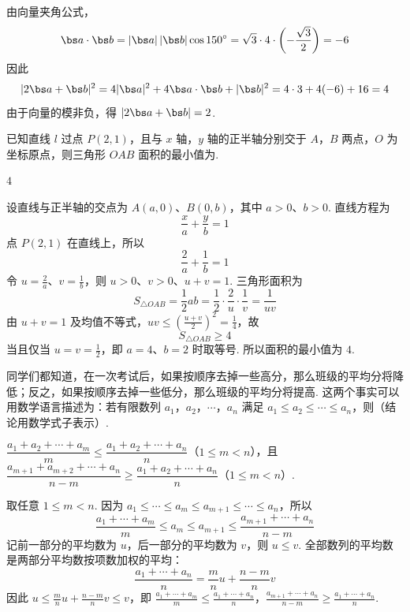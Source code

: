 \begin{solution}
由向量夹角公式，
\[
\bs a\cdot\bs b=|\bs a|\,|\bs b|\cos150^\circ
 =\sqrt3\cdot4\cdot\left(-\frac{\sqrt3}{2}\right)=-6
\]
因此
\[
|2\bs a+\bs b|^2=4|\bs a|^2+4\bs a\cdot\bs b+|\bs b|^2=4\cdot3+4(-6)+16=4
\]
由于向量的模非负，得 \(|2\bs a+\bs b|=2\).
\end{solution}

\begin{problem}
已知直线 \(l\) 过点 \(P(2,1)\)，且与 \(x\) 轴，\(y\) 轴的正半轴分别交于 \(A\)，\(B\) 两点，\(O\) 为坐标原点，则三角形 \(OAB\) 面积的最小值为\fillinblank{}.
\end{problem}

\begin{answer}
\(4\)
\end{answer}

\begin{solution}
设直线与正半轴的交点为 \(A(a,0)\)、\(B(0,b)\)，其中 \(a>0\)、\(b>0\). 直线方程为
\[
\frac{x}{a}+\frac{y}{b}=1
\]
点 \(P(2,1)\) 在直线上，所以
\[
\frac2a+\frac1b=1
\]
令 \(u=\frac2a\)、\(v=\frac1b\)，则 \(u>0\)、\(v>0\)、\(u+v=1\). 三角形面积为
\[
S_{\triangle OAB}=\frac12ab=\frac12\cdot\frac2u\cdot\frac1v=\frac1{uv}
\]
由 \(u+v=1\) 及均值不等式，\(uv\le\left(\frac{u+v}{2}\right)^2=\frac14\)，故
\[
S_{\triangle OAB}\ge4
\]
当且仅当 \(u=v=\frac12\)，即 \(a=4\)、\(b=2\) 时取等号. 所以面积的最小值为 \(4\).
\end{solution}

\begin{problem}
同学们都知道，在一次考试后，如果按顺序去掉一些高分，那么班级的平均分将降低；反之，如果按顺序去掉一些低分，那么班级的平均分将提高. 这两个事实可以用数学语言描述为：若有限数列 \(a_1\)，\(a_2\)，\(\cdots\)，\(a_n\) 满足 \(a_1\le a_2\le\cdots\le a_n\)，则（结论用数学式子表示）\fillinblank{}.
\end{problem}

\begin{answer}
\(\dfrac{a_1+a_2+\cdots+a_m}{m}\le\dfrac{a_1+a_2+\cdots+a_n}{n}\)（\(1\le m<n\)），且 \(\dfrac{a_{m+1}+a_{m+2}+\cdots+a_n}{n-m}\ge\dfrac{a_1+a_2+\cdots+a_n}{n}\)（\(1\le m<n\)）.
\end{answer}

\begin{solution}
取任意 \(1\le m<n\). 因为 \(a_1\le\cdots\le a_m\le a_{m+1}\le\cdots\le a_n\)，所以
\[
\frac{a_1+\cdots+a_m}{m}\le a_m\le a_{m+1}\le\frac{a_{m+1}+\cdots+a_n}{n-m}
\]
记前一部分的平均数为 \(u\)，后一部分的平均数为 \(v\)，则 \(u\le v\). 全部数列的平均数是两部分平均数按项数加权的平均：
\[
\frac{a_1+\cdots+a_n}{n}=\frac{m}{n}u+\frac{n-m}{n}v
\]
因此 \(u\le\frac{m}{n}u+\frac{n-m}{n}v\le v\)，即
\(\frac{a_1+\cdots+a_m}{m}\le\frac{a_1+\cdots+a_n}{n}\)，\(\frac{a_{m+1}+\cdots+a_n}{n-m}\ge\frac{a_1+\cdots+a_n}{n}\).
\end{solution}

